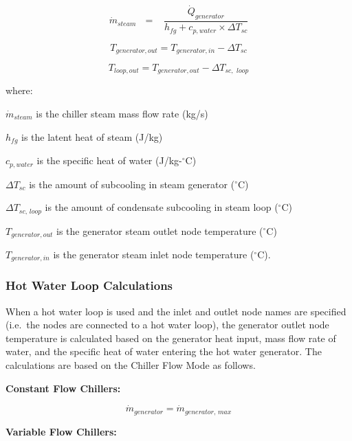 \begin{equation}
{\dot m_{steam}}\,\,\,\, = \,\,\,\,\,\frac{{{{\dot Q}_{generator}}}}{{{h_{fg}} + {c_{p,water}} \times \Delta {T_{sc}}}}
\end{equation}

\begin{equation}
{T_{generator,out}} = {T_{generator,in}} - \Delta {T_{sc}}
\end{equation}

\begin{equation}
{T_{loop,out}} = {T_{generator,out}} - \Delta {T_{sc,\,\,loop}}
\end{equation}

where:

\({\dot m_{steam}}\) is the chiller steam mass flow rate (kg/s)

\({h_{fg}}\) is the latent heat of steam (J/kg)

\({c_{p,water}}\) is the specific heat of water (J/kg-\(^{\circ}\)C)

\(\Delta {T_{sc}}\) is the amount of subcooling in steam generator (\(^{\circ}\)C)

\(\Delta {T_{sc,\,loop}}\) is the amount of condensate subcooling in steam loop (\(^{\circ}\)C)

\({T_{generator,out}}\) is the generator steam outlet node temperature (\(^{\circ}\)C)

\({T_{generator,in}}\) is the generator steam inlet node temperature (\(^{\circ}\)C).

\subsubsection{Hot Water Loop Calculations}\label{hot-water-loop-calculations-1}

When a hot water loop is used and the inlet and outlet node names are specified (i.e.~the nodes are connected to a hot water loop), the generator outlet node temperature is calculated based on the generator heat input, mass flow rate of water, and the specific heat of water entering the hot water generator. The calculations are based on the Chiller Flow Mode as follows.

\textbf{Constant Flow Chillers:}

\begin{equation}
{\dot m_{generator}} = {\dot m_{generator,\,max}}
\end{equation}

\textbf{Variable Flow Chillers:}

